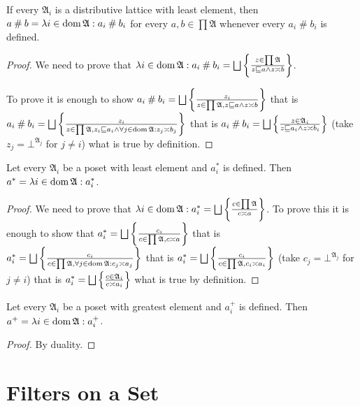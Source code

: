 \begin{prop}
If every $\mathfrak{A}_{i}$ is a distributive lattice with least
element, then $a\mathbin\#b=\lambda i\in\operatorname{dom}\mathfrak{A}:a_{i}\mathbin\#b_{i}$
for every $a,b\in\prod\mathfrak{A}$ whenever every $a_{i}\mathbin\#b_{i}$
is defined.\end{prop}
\begin{proof}
We need to prove that $\lambda i\in\dom\mathfrak{A}:a_{i}\mathbin\#b_{i}=\bigsqcup\setcond{z\in\prod\mathfrak{A}}{z\sqsubseteq a\land z\asymp b}$.

To prove it is enough to show $a_{i}\mathbin\#b_{i}=\bigsqcup\setcond{z_{i}}{z\in\prod\mathfrak{A},z\sqsubseteq a\land z\asymp b}$
that is $a_{i}\mathbin\#b_{i}=\bigsqcup\setcond{z_i}{z\in\prod\mathfrak{A},z_i\sqsubseteq a_{i}\land\forall j\in\dom\mathfrak{A}:z_{j}\asymp b_{j}}$
that is $a_{i}\mathbin\#b_{i}=\bigsqcup\setcond{z\in\mathfrak{A}_{i}}{z\sqsubseteq a_{i}\land z\asymp b_{i}}$
(take $z_{j}=\bot^{\mathfrak{A}_j}$ for $j\ne i$) what is true by definition.\end{proof}
\begin{prop}
Let every $\mathfrak{A}_{i}$ be a poset with least element and $a_{i}^{\ast}$
is defined. Then $a^{\ast}=\lambda i\in\operatorname{dom}\mathfrak{A}:a_{i}^{\ast}$.\end{prop}
\begin{proof}
We need to prove that $\mylambda i{\dom\mathfrak{A}}{a_{i}^{\ast}}=\bigsqcup\setcond{c\in\prod\mathfrak{A}}{c\asymp a}$.
To prove this it is enough to show that $a_{i}^{\ast}=\bigsqcup\setcond{c_{i}}{c\in\prod\mathfrak{A},c\asymp a}$
that is $a_{i}^{\ast}=\bigsqcup\setcond{c_{i}}{c\in\prod\mathfrak{A},\forall j\in\dom\mathfrak{A}:c_{j}\asymp a_{j}}$
that is $a_{i}^{\ast}=\bigsqcup\setcond{c_{i}}{c\in\prod\mathfrak{A},c_{i}\asymp a_{i}}$
(take $c_{j}=\bot^{\mathfrak{A}_j}$ for $j\neq i$) that is $a_{i}^{\ast}=\bigsqcup\setcond{c\in\mathfrak{A}_{i}}{c\asymp a_{i}}$
what is true by definition.\end{proof}
\begin{cor}
Let every $\mathfrak{A}_{i}$ be a poset with greatest element and
$a_{i}^{+}$ is defined. Then $a^{+}=\lambda i\in\operatorname{dom}\mathfrak{A}:a_{i}^{+}$.\end{cor}
\begin{proof}
By duality.
\end{proof}

\section{Filters on a Set}


